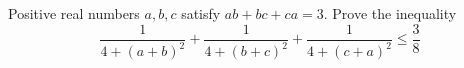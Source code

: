 Positive real numbers $a, b,c$ satisfy $ab + bc+ ca = 3$. Prove the inequality $$\frac{1}{4+(a+b)^2}+\frac{1}{4+(b+c)^2}+\frac{1}{4+(c+a)^2}\le \frac{3}{8}$$